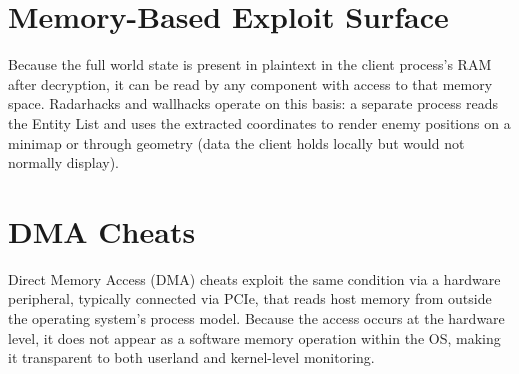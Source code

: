 \section{Memory-Based Exploit Surface}

Because the full world state is present in plaintext in the client process's RAM after decryption, it can be read by any component with access to that memory space. Radarhacks and wallhacks operate on this basis: a separate process reads the Entity List and uses the extracted coordinates to render enemy positions on a minimap or through geometry (data the client holds locally but would not normally display).

\section{DMA Cheats}

Direct Memory Access (DMA) cheats exploit the same condition via a hardware peripheral, typically connected via PCIe, that reads host memory from outside the operating system's process model. Because the access occurs at the hardware level, it does not appear as a software memory operation within the OS, making it transparent to both userland and kernel-level monitoring.
